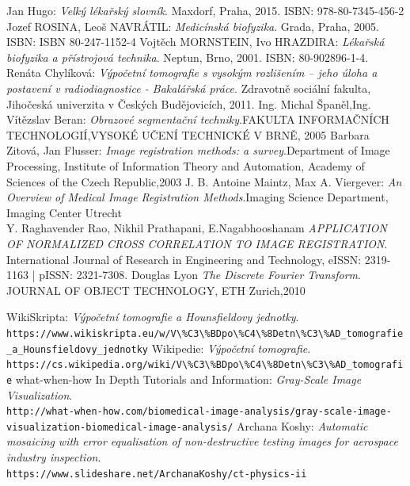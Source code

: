 \documentclass{thesis}%
\begin{document}
\begin{thebibliography}{DUSO}
   Jan Hugo:
    \emph{Velký lékařský slovník}. Maxdorf, Praha, 2015. ISBN: 978-80-7345-456-2 
   Jozef ROSINA, Leoš NAVRÁTIL:
    \emph{Medicínská biofyzika}. Grada, Praha, 2005. ISBN: ISBN 80-247-1152-4
  Vojtěch MORNSTEIN, Ivo HRAZDIRA:
    \emph{Lékařská biofyzika a přístrojová technika}. Neptun, Brno, 2001. ISBN: 80-902896-1-4.
  Renáta Chylíková:
    \emph{Výpočetní tomografie s vysokým rozlišením – jeho úloha a postavení v radiodiagnostice - Bakalářská práce}. Zdravotně sociální fakulta, Jihočeská univerzita v Českých Budějovicích, 2011.
  Ing. Michal Španěl,Ing. Vítězslav Beran:
    \emph{Obrazové segmentační techniky}.FAKULTA INFORMAČNÍCH TECHNOLOGIÍ,VYSOKÉ UČENÍ TECHNICKÉ V BRNĚ, 2005
  Barbara Zitová, Jan Flusser:
    \emph{Image registration methods: a survey}.Department of Image Processing, Institute of Information Theory and Automation, Academy of Sciences of the Czech Republic,2003
J. B. Antoine Maintz, Max A. Viergever:
    \emph{An Overview of Medical Image Registration Methods}.Imaging Science Department, Imaging Center Utrecht\\
Y. Raghavender Rao, Nikhil Prathapani, E.Nagabhooshanam
    \emph{APPLICATION OF NORMALIZED CROSS CORRELATION TO IMAGE REGISTRATION}.  International Journal of Research in Engineering and Technology, eISSN: 2319-1163 | pISSN: 2321-7308.
Douglas Lyon
    \emph{The Discrete Fourier Transform}. JOURNAL OF OBJECT TECHNOLOGY, ETH Zurich,2010


    WikiSkripta:
    \emph{Výpočetní tomografie a Hounsfieldovy jednotky}. \\
    \verb|https://www.wikiskripta.eu/w/V\%C3\%BDpo\%C4\%8Detn\%C3\%AD_tomografie_a_Hounsfieldovy_jednotky|
  Wikipedie:
    \emph{Výpočetní tomografie}. \\
    \verb|https://cs.wikipedia.org/wiki/V\%C3\%BDpo\%C4\%8Detn\%C3\%AD_tomografie|
  what-when-how In Depth Tutorials and Information:
    \emph{Gray-Scale Image Visualization}. \\
    \verb|http://what-when-how.com/biomedical-image-analysis/gray-scale-image-visualization-biomedical-image-analysis/|
Archana Koshy:
    \emph{Automatic mosaicing with error equalisation of non-destructive testing images for aerospace industry inspection}.\\
    \verb|https://www.slideshare.net/ArchanaKoshy/ct-physics-ii|


\end{thebibliography}
\end{document}
